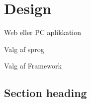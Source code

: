 \graphicspath{{Chapters/Design/}}

\chapter{Design}

Web eller PC aplikkation

Valg af sprog

Valg af Framework
\section{Section heading}